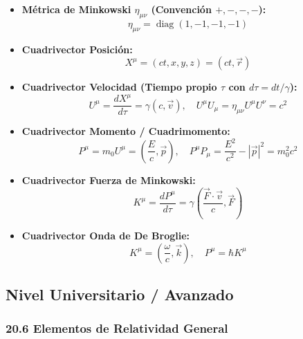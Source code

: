 \documentclass[11pt,a4paper]{article}
\begin{document}
\begin{itemize}
  \item \textbf{Métrica de Minkowski $\eta_{\mu\nu}$ (Convención $+,-,-,-$):}
  \[
    \eta_{\mu\nu} = \operatorname{diag}(1, -1, -1, -1)
  \]
  \item \textbf{Cuadrivector Posición:}
  \[
    X^\mu = (ct, x, y, z) = (ct, \vec{r})
  \]
  \item \textbf{Cuadrivector Velocidad (Tiempo propio $\tau$ con $d\tau = dt/\gamma$):}
  \[
    U^\mu = \frac{dX^\mu}{d\tau} = \gamma(c, \vec{v}), \quad U^\mu U_\mu = \eta_{\mu\nu} U^\mu U^\nu = c^2
  \]
  \item \textbf{Cuadrivector Momento / Cuadrimomento:}
  \[
    P^\mu = m_0 U^\mu = \left( \frac{E}{c}, \vec{p} \right), \quad P^\mu P_\mu = \frac{E^2}{c^2} - |\vec{p}|^2 = m_0^2 c^2
  \]
  \item \textbf{Cuadrivector Fuerza de Minkowski:}
  \[
    K^\mu = \frac{dP^\mu}{d\tau} = \gamma \left( \frac{\vec{F} \cdot \vec{v}}{c}, \vec{F} \right)
  \]
  \item \textbf{Cuadrivector Onda de De Broglie:}
  \[
    K^\mu = \left( \frac{\omega}{c}, \vec{k} \right), \quad P^\mu = \hbar K^\mu
  \]
\end{itemize}

\subsection*{Nivel Universitario / Avanzado}

\subsubsection*{20.6 Elementos de Relatividad General}
\end{document}
